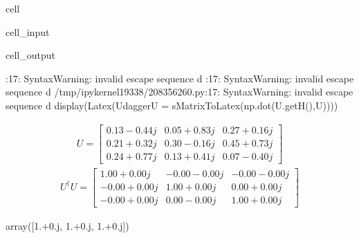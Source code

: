 \documentclass[letterpaper,10pt,english]{jupyterBook}
\begin{document}
\begin{sphinxuseclass}{cell}
\begin{sphinxVerbatimInput}
\begin{sphinxuseclass}{cell_input}
\end{sphinxuseclass}\end{sphinxVerbatimInput}
\begin{sphinxVerbatimOutput}

\begin{sphinxuseclass}{cell_output}
\begin{sphinxVerbatim}[commandchars=\\\{\}]
[2.047\PYGZhy{}0.j 0.753+0.j 0.217+0.j]
\end{sphinxVerbatim}

\begin{sphinxVerbatim}[commandchars=\\\{\}]
\PYGZlt{}\PYGZgt{}:17: SyntaxWarning: invalid escape sequence \PYGZsq{}\PYGZbs{}d\PYGZsq{}
\PYGZlt{}\PYGZgt{}:17: SyntaxWarning: invalid escape sequence \PYGZsq{}\PYGZbs{}d\PYGZsq{}
/tmp/ipykernel\PYGZus{}19338/208356260.py:17: SyntaxWarning: invalid escape sequence \PYGZsq{}\PYGZbs{}d\PYGZsq{}
  display(Latex(\PYGZsq{}\PYGZdl{}\PYGZdl{}U\PYGZca{}\PYGZob{}\PYGZbs{}dagger\PYGZcb{}U = \PYGZpc{}s\PYGZdl{}\PYGZdl{}\PYGZsq{}\PYGZpc{}MatrixToLatex(np.dot(U.getH(),U))))
\end{sphinxVerbatim}
\begin{equation*}
\begin{split}U = \begin{bmatrix} 0.13-0.44j&0.05+0.83j&0.27+0.16j \\0.21+0.32j&0.30-0.16j&0.45+0.73j \\0.24+0.77j&0.13+0.41j&0.07-0.40j \end{bmatrix}\end{split}
\end{equation*}\begin{equation*}
\begin{split}U^{\dagger}U = \begin{bmatrix} 1.00+0.00j&-0.00-0.00j&-0.00-0.00j \\-0.00+0.00j&1.00+0.00j&0.00+0.00j \\-0.00+0.00j&0.00-0.00j&1.00+0.00j \end{bmatrix}\end{split}
\end{equation*}
\begin{sphinxVerbatim}[commandchars=\\\{\}]
array([1.+0.j, 1.+0.j, 1.+0.j])
\end{sphinxVerbatim}

\end{sphinxuseclass}\end{sphinxVerbatimOutput}

\end{sphinxuseclass}
\end{document}
